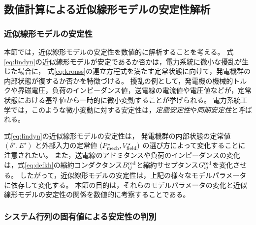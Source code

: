 \documentclass[tombow,dvipdfmx]{corona-a5}
\begin{document}
\subsection{数値計算による近似線形モデルの安定性解析}\label{sec:numlinsta}

\subsubsection{近似線形モデルの安定性}

本節では，近似線形モデルの安定性を数値的に解析することを考える。
式\ref{eq:lindyn}の近似線形モデルが安定であるか否かは，電力系統に微小な擾乱が生じた場合に，
式\ref{eq:kronss}の連立方程式を満たす定常状態に向けて，発電機群の内部状態が復するか否かを特徴づける。
擾乱の例として，発電機の機械的トルクや界磁電圧，負荷のインピーダンス値，送電線の電流値や電圧値などが，定常状態における基準値から一時的に微小変動することが挙げられる。
電力系統工学では，このような微小変動に対する安定性は，\emph{定態安定性}や\emph{同期安定性}と呼ばれる。


式\ref{eq:lindyn}の近似線形モデルの安定性は，
発電機群の内部状態の定常値
$(\delta^{\star},E^{\star})$
と外部入力の定常値
$(P_{{\rm mech}}^{\star},V_{{\rm field}}^{\star})$
の選び方によって変化することに注意されたい。
また，送電線のアドミタンスや負荷のインピーダンスの変化は，式\ref{eq:defkh}の縮約コンダクタンス$B^{\rm red}_{ij}$と縮約サセプタンス$G^{\rm red}_{ij}$を変化させる。
したがって，近似線形モデルの安定性は，上記の様々なモデルパラメータに依存して変化する。
本節の目的は，それらのモデルパラメータの変化と近似線形モデルの安定性の関係を数値的に考察することである。

\subsubsection{システム行列の固有値による安定性の判別}
\end{document}
